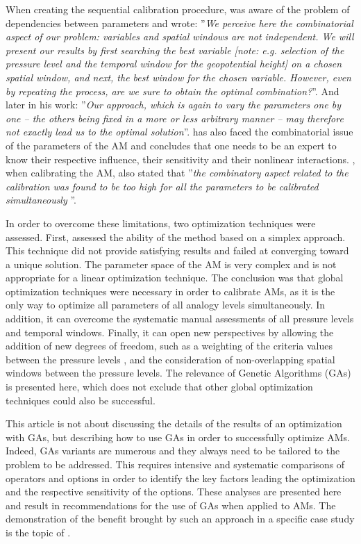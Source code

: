 \documentclass[twocol]{ametsoc}
\begin{document}
When creating the sequential calibration procedure, \citet{Bontron2004} was aware of the problem of dependencies between parameters and wrote: ''\textit{We perceive here the combinatorial aspect of our problem: variables and spatial windows are not independent. We will present our results by first searching the best variable [note: e.g. selection of the pressure level and the temporal window for the geopotential height] on a chosen spatial window, and next, the best window for the chosen variable. However, even by repeating the process, are we sure to obtain the optimal combination?}''. And later in his work: ''\textit{Our approach, which is again to vary the parameters one by one -- the others being fixed in a more or less arbitrary manner -- may therefore not exactly lead us to the optimal solution}''. \citet{Bliefernicht2010} has also faced the combinatorial issue of the parameters of the AM and concludes that one needs to be an expert to know their respective influence, their sensitivity and their nonlinear interactions. \citet{BenDaoud2010}, when calibrating the AM, also stated that ''\textit{the combinatory aspect related to the calibration was found to be too high for all the parameters to be calibrated simultaneously }''.

In order to overcome these limitations, two optimization techniques were assessed. First, \citet{Horton2012a} assessed the ability of the \citet{Nelder1965a} method based on a simplex approach. This technique did not provide satisfying results and failed at converging toward a unique solution. The parameter space of the AM is very complex and is not appropriate for a linear optimization technique. The conclusion was that global optimization techniques were necessary in order to calibrate AMs, as it is the only way to optimize all parameters of all analogy levels simultaneously. In addition, it can overcome the systematic manual assessments of all pressure levels and temporal windows. Finally, it can open new perspectives by allowing the addition of new degrees of freedom, such as a weighting of the criteria values between the pressure levels \citep[see][]{Horton2016b}, and the consideration of non-overlapping spatial windows between the pressure levels. The relevance of Genetic Algorithms (GAs) is presented here, which does not exclude that other global optimization techniques could also be successful. 

This article is not about discussing the details of the results of an optimization with GAs, but describing how to use GAs in order to successfully optimize AMs. Indeed, GAs variants are numerous and they always need to be tailored to the problem to be addressed. This requires intensive and systematic comparisons of operators and options in order to identify the key factors leading the optimization and the respective sensitivity of the options. These analyses are presented here and result in recommendations for the use of GAs when applied to AMs. The demonstration of the benefit brought by such an approach in a specific case study is the topic of \citet{Horton2016b}. 
\end{document}
